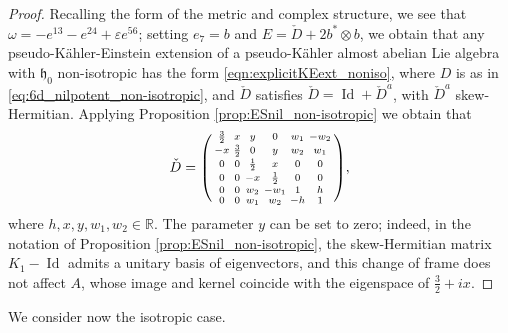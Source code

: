 \documentclass{article}
\theoremstyle{definition}
\DeclareMathOperator{\Id}{Id}
\newcommand{\R}{\mathbb{R}}
\newcommand{\frh}{\mathfrak{h}}
\newenvironment{smallpmatrix}{\left(\begin{smallmatrix}}{\end{smallmatrix}\right)}
\begin{document}
\begin{proof}
    Recalling the form of the metric and complex structure, we see that $\omega=-e^{13}-e^{24}+\varepsilon e^{56}$; setting $e_7=b$ and $E=\check{D}+2b^*\otimes b$, we obtain that any pseudo-Kähler-Einstein extension of a pseudo-Kähler almost abelian Lie algebra with $\frh_0$ non-isotropic has the form \eqref{eqn:explicitKEext_noniso}, where $D$ is as in \eqref{eq:6d_nilpotent_non-isotropic}, and $\check{D}$ satisfies $\check{D}=\Id+\check{D}^a$, with $\check{D}^a$ skew-Hermitian. Applying Proposition \ref{prop:ESnil_non-isotropic} we obtain that $$\check{D}=\begin{smallpmatrix}
        \frac{3}{2} & x & y & 0 & w_1 & -w_2\\
        -x & \frac{3}{2} & 0 & y & w_2 & w_1\\
        0 & 0 & \frac{1}{2} & x & 0 & 0\\
        0 & 0 & -x & \frac{1}{2} & 0 & 0\\
        0 & 0 & w_2 & -w_1 & 1 & h\\
        0 & 0 & w_1 & w_2 & -h & 1
    \end{smallpmatrix},$$ where $h,x,y,w_1,w_2\in\R$. The parameter $y$ can be set to zero; indeed, in the notation of Proposition \ref{prop:ESnil_non-isotropic}, the skew-Hermitian matrix $K_1-\Id$ admits a unitary basis of eigenvectors, and this change of frame does not affect $A$, whose image and kernel coincide with the eigenspace of $\frac32+ix$.
\end{proof}

We consider now the isotropic case.
\end{document}
